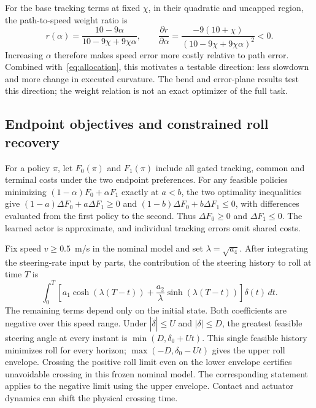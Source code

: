 \documentclass[journal]{IEEEtran}
\begin{document}
For the base tracking terms at fixed $\chi$, in their quadratic and uncapped region, the path-to-speed weight ratio is
\begin{equation}
 r(\alpha)=\frac{10-9\alpha}{10-9\chi+9\chi\alpha},\qquad
 \frac{\partial r}{\partial\alpha}=
 \frac{-9(10+\chi)}{(10-9\chi+9\chi\alpha)^2}<0.
 \label{eq:weights}
\end{equation}
Increasing $\alpha$ therefore makes speed error more costly relative to path error. Combined with~\eqref{eq:allocation}, this motivates a testable direction: less slowdown and more change in executed curvature. The bend and error-plane results test this direction; the weight relation is not an exact optimizer of the full task.

\subsection{Endpoint objectives and constrained roll recovery}
For a policy $\pi$, let $F_0(\pi)$ and $F_1(\pi)$ include all gated tracking, common and terminal costs under the two endpoint preferences. For any feasible policies minimizing $(1-\alpha)F_0+\alpha F_1$ exactly at $a<b$, the two optimality inequalities give
$ (1-a)\Delta F_0+a\Delta F_1\geq0$ and
$ (1-b)\Delta F_0+b\Delta F_1\leq0$, with differences evaluated from the first policy to the second. Thus $\Delta F_0\geq0$ and $\Delta F_1\leq0$. The learned actor is approximate, and individual tracking errors omit shared costs.

Fix speed $v\geq0.5$~m/s in the nominal model and set $\lambda=\sqrt{a_4}$. After integrating the steering-rate input by parts, the contribution of the steering history to roll at time $T$ is
\begin{equation}
\int_0^T \left[a_1\cosh(\lambda(T-t))+
  \frac{a_2}{\lambda}\sinh(\lambda(T-t))\right]\delta(t)\,dt .
\end{equation}
The remaining terms depend only on the initial state. Both coefficients are negative over this speed range. Under $|\dot\delta|\le U$ and $|\delta|\le D$, the greatest feasible steering angle at every instant is $\min(D,\delta_0+Ut)$. This single feasible history minimizes roll for every horizon; $\max(-D,\delta_0-Ut)$ gives the upper roll envelope. Crossing the positive roll limit even on the lower envelope certifies unavoidable crossing in this frozen nominal model. The corresponding statement applies to the negative limit using the upper envelope. Contact and actuator dynamics can shift the physical crossing time.
\end{document}
